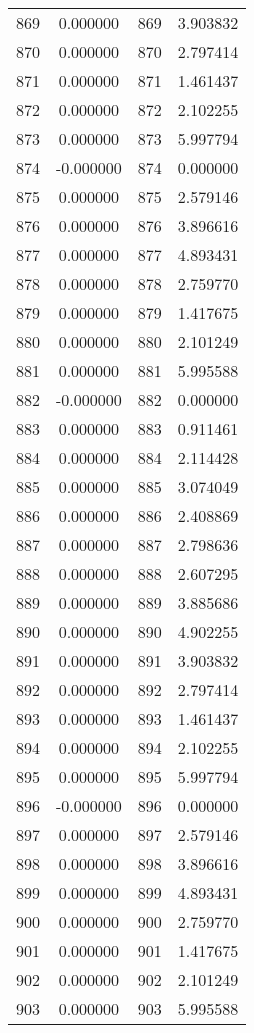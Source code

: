 \documentclass[12pt]{article}
\begin{document}
\begin{longtable}{@{}cccc@{}}
869 & 0.000000 & 869 & 3.903832 \\
870 & 0.000000 & 870 & 2.797414 \\
871 & 0.000000 & 871 & 1.461437 \\
872 & 0.000000 & 872 & 2.102255 \\
873 & 0.000000 & 873 & 5.997794 \\
874 & -0.000000 & 874 & 0.000000 \\
875 & 0.000000 & 875 & 2.579146 \\
876 & 0.000000 & 876 & 3.896616 \\
877 & 0.000000 & 877 & 4.893431 \\
878 & 0.000000 & 878 & 2.759770 \\
879 & 0.000000 & 879 & 1.417675 \\
880 & 0.000000 & 880 & 2.101249 \\
881 & 0.000000 & 881 & 5.995588 \\
882 & -0.000000 & 882 & 0.000000 \\
883 & 0.000000 & 883 & 0.911461 \\
884 & 0.000000 & 884 & 2.114428 \\
885 & 0.000000 & 885 & 3.074049 \\
886 & 0.000000 & 886 & 2.408869 \\
887 & 0.000000 & 887 & 2.798636 \\
888 & 0.000000 & 888 & 2.607295 \\
889 & 0.000000 & 889 & 3.885686 \\
890 & 0.000000 & 890 & 4.902255 \\
891 & 0.000000 & 891 & 3.903832 \\
892 & 0.000000 & 892 & 2.797414 \\
893 & 0.000000 & 893 & 1.461437 \\
894 & 0.000000 & 894 & 2.102255 \\
895 & 0.000000 & 895 & 5.997794 \\
896 & -0.000000 & 896 & 0.000000 \\
897 & 0.000000 & 897 & 2.579146 \\
898 & 0.000000 & 898 & 3.896616 \\
899 & 0.000000 & 899 & 4.893431 \\
900 & 0.000000 & 900 & 2.759770 \\
901 & 0.000000 & 901 & 1.417675 \\
902 & 0.000000 & 902 & 2.101249 \\
903 & 0.000000 & 903 & 5.995588 \\

\end{longtable}
\end{document}
